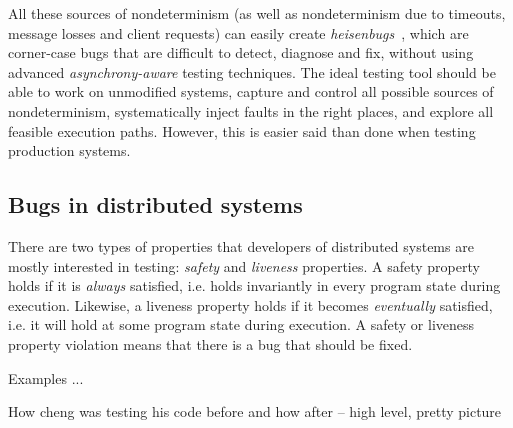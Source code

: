 All these sources of nondeterminism (as well as nondeterminism due to timeouts, message losses and client requests) can easily create \emph{heisenbugs}~\cite{musuvathi2008finding}, which are corner-case bugs that are difficult to detect, diagnose and fix, without using advanced \emph{asynchrony-aware} testing techniques.
%
The ideal testing tool should be able to work on unmodified systems, capture and control all possible sources of nondeterminism, systematically inject faults in the right places, and explore all feasible execution paths. However, this is easier said than done when testing production systems.

\subsection{Bugs in distributed systems}
\label{sec:overview:bugs}

There are two types of properties that developers of distributed systems are mostly interested in testing: \emph{safety} and \emph{liveness} properties. A safety property holds if it is \emph{always} satisfied, i.e. holds invariantly in every program state during execution. Likewise, a liveness property holds if it becomes \emph{eventually} satisfied, i.e. it will hold at some program state during execution. A safety or liveness property violation means that there is a bug that should be fixed.

Examples ...

How cheng was testing his code before and how after -- high level, pretty picture

